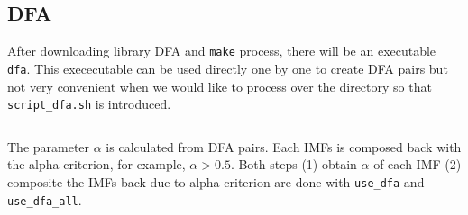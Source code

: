 \documentclass{article}
\begin{document}
\subsection*{DFA}
After downloading library DFA and \texttt{make} process, there will be an executable \texttt{dfa}. This exececutable can be used directly one by one to create DFA pairs but not very convenient when we would like to process over the directory so that \texttt{script\_dfa.sh} is introduced.\\
\begin{verbatim}
\end{verbatim}

The parameter $\alpha$ is calculated from DFA pairs. Each IMFs is composed back with the alpha criterion, for example, $\alpha > 0.5$. Both steps (1) obtain $\alpha$ of each IMF (2) composite the IMFs back due to alpha criterion are done with \texttt{use\_dfa} and \texttt{use\_dfa\_all}.
\end{document}
